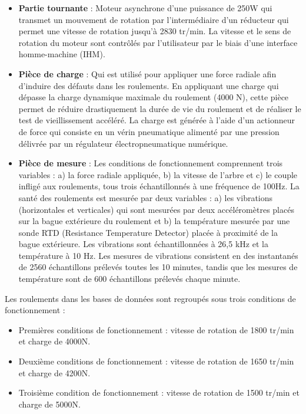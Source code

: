 \begin{itemize}
	\item \textbf{Partie tournante} : Moteur asynchrone d'une puissance de 250W qui transmet un mouvement de rotation par l'intermédiaire d'un réducteur qui permet une vitesse de rotation jusqu'à 2830 tr/min. La vitesse et le sens de rotation du moteur sont contrôlés par l'utilisateur par le biais d'une interface homme-machine (IHM).
	\item \textbf{Pièce de charge} : Qui est utilisé pour appliquer une force radiale afin d'induire des défauts dans les roulements. En appliquant une charge qui dépasse la charge dynamique maximale du roulement (4000 N), cette pièce permet de réduire drastiquement la durée de vie du roulement et de réaliser le test de vieillissement accéléré. La charge est générée à l'aide d'un actionneur de force qui consiste en un vérin pneumatique alimenté par une pression délivrée par un régulateur électropneumatique numérique.
	\item \textbf{Pièce de mesure} : Les conditions de fonctionnement comprennent trois variables : a) la force radiale appliquée, b) la vitesse de l'arbre et c) le couple infligé aux roulements, tous trois échantillonnés à une fréquence de 100Hz. La santé des roulements est mesurée par deux variables : a) les vibrations (horizontales et verticales) qui sont mesurées par deux accéléromètres placés sur la bague extérieure du roulement et b) la température mesurée par une sonde RTD (Resistance Temperature Detector) placée à proximité de la bague extérieure. Les vibrations sont échantillonnées à 26,5 kHz et la température à 10 Hz. Les mesures de vibrations consistent en des instantanés de 2560 échantillons prélevés toutes les 10 minutes, tandis que les mesures de température sont de 600 échantillons prélevés chaque minute.
\end{itemize}

Les roulements dans les bases de données sont regroupés sous trois conditions de fonctionnement :
\begin{itemize}
	\item Premières conditions de fonctionnement : vitesse de rotation de 1800 tr/min et charge de 4000N.
	\item Deuxième conditions de fonctionnement : vitesse de rotation de 1650 tr/min et charge de 4200N.
	\item Troisième condition de fonctionnement : vitesse de rotation de 1500 tr/min et charge de 5000N.
\end{itemize}

